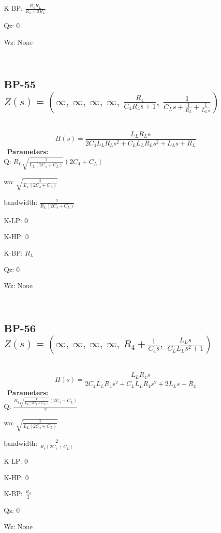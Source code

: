 \documentclass{article}
\begin{document}
K-BP: $\frac{R_{4} R_{L}}{R_{4} + 2 R_{L}}$\ 

Qz: $0$\ 

Wz: $\text{None}$\ 

\ 

\subsection{BP-55 $Z(s) = \left( \infty, \  \infty, \  \infty, \  \infty, \  \frac{R_{4}}{C_{4} R_{4} s + 1}, \  \frac{1}{C_{L} s + \frac{1}{R_{L}} + \frac{1}{L_{L} s}}\right)$ } \ 
\textbf{\[H(s) = \frac{L_{L} R_{L} s}{2 C_{4} L_{L} R_{L} s^{2} + C_{L} L_{L} R_{L} s^{2} + L_{L} s + R_{L}}\] } \ 
\textbf{Parameters:}\\ 

Q: $R_{L} \sqrt{\frac{1}{L_{L} \left(2 C_{4} + C_{L}\right)}} \left(2 C_{4} + C_{L}\right)$\ 

wo: $\sqrt{\frac{1}{L_{L} \left(2 C_{4} + C_{L}\right)}}$\ 

bandwidth: $\frac{1}{R_{L} \left(2 C_{4} + C_{L}\right)}$\ 

K-LP: $0$\ 

K-HP: $0$\ 

K-BP: $R_{L}$\ 

Qz: $0$\ 

Wz: $\text{None}$\ 

\ 

\subsection{BP-56 $Z(s) = \left( \infty, \  \infty, \  \infty, \  \infty, \  R_{4} + \frac{1}{C_{4} s}, \  \frac{L_{L} s}{C_{L} L_{L} s^{2} + 1}\right)$ } \ 
\textbf{\[H(s) = \frac{L_{L} R_{4} s}{2 C_{4} L_{L} R_{4} s^{2} + C_{L} L_{L} R_{4} s^{2} + 2 L_{L} s + R_{4}}\] } \ 
\textbf{Parameters:}\\ 

Q: $\frac{R_{4} \sqrt{\frac{1}{L_{L} \left(2 C_{4} + C_{L}\right)}} \left(2 C_{4} + C_{L}\right)}{2}$\ 

wo: $\sqrt{\frac{1}{L_{L} \left(2 C_{4} + C_{L}\right)}}$\ 

bandwidth: $\frac{2}{R_{4} \left(2 C_{4} + C_{L}\right)}$\ 

K-LP: $0$\ 

K-HP: $0$\ 

K-BP: $\frac{R_{4}}{2}$\ 

Qz: $0$\ 

Wz: $\text{None}$\ 
\end{document}
